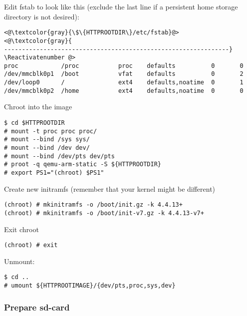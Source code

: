 


Edit fstab to look like this (exclude the last line if a persistent
home storage directory is not desired):
\Suppressnumber\begin{lstlisting}[]
<@\textcolor{gray}{\$\{HTTPROOTDIR\}/etc/fstab}@>
<@\textcolor{gray}{
---------------------------------------------------------------}
\Reactivatenumber @>
proc            /proc           proc    defaults          0       0
/dev/mmcblk0p1  /boot           vfat    defaults          0       2
/dev/loop0      /               ext4    defaults,noatime  0       1
/dev/mmcblk0p2  /home           ext4    defaults,noatime  0       0
\end{lstlisting}
\FloatBarrier
\vspace{-5mm}


Chroot into the image
\begin{lstlisting}[]
$ cd $HTTPROOTDIR
# mount -t proc proc proc/
# mount --bind /sys sys/
# mount --bind /dev dev/
# mount --bind /dev/pts dev/pts
# proot -q qemu-arm-static -S ${HTTPROOTDIR}
# export PS1="(chroot) $PS1"
\end{lstlisting}
\FloatBarrier
\vspace{-5mm}


Create new initramfs (remember that your kernel might be different)
\begin{lstlisting}[]
(chroot) # mkinitramfs -o /boot/init.gz -k 4.4.13+
(chroot) # mkinitramfs -o /boot/init-v7.gz -k 4.4.13-v7+
\end{lstlisting}
\FloatBarrier
\vspace{-5mm}

Exit chroot
\begin{lstlisting}[]
(chroot) # exit
\end{lstlisting}
\FloatBarrier
\vspace{-5mm}

Unmount:
\begin{lstlisting}[]
$ cd ..
# umount ${HTTPROOTIMAGE}/{dev/pts,proc,sys,dev}
\end{lstlisting}
\FloatBarrier
\vspace{-5mm}


\subsubsection{Prepare sd-card}

